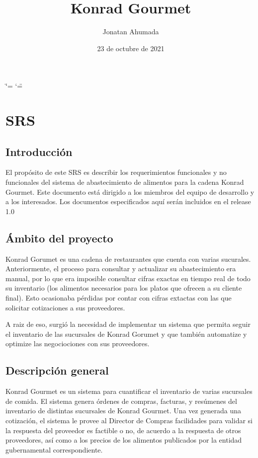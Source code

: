 \documentclass[letterpaper,10pt,spanish]{sphinxmanual}
\title{Konrad Gourmet}
\date{23 de octubre de 2021}
\author{Jonatan Ahumada}
\begin{document}
\ifdefined\shorthandoff
  \ifnum\catcode`\=\string=\active\shorthandoff{=}\fi
  \ifnum\catcode`\"=\active{}\fi
\fi

\pagestyle{empty}
\sphinxmaketitle
\pagestyle{plain}
\sphinxtableofcontents
\pagestyle{normal}
\label{\detokenize{index::doc}}



\chapter{SRS}
\label{\detokenize{SRS:srs}}\label{\detokenize{SRS::doc}}

\section{Introducción}
\label{\detokenize{SRS:introduccion}}
\sphinxAtStartPar
El propósito de este SRS es
describir los requerimientos
funcionales y no funcionales
del sistema de abastecimiento
de alimentos para la cadena
Konrad Gourmet. Este documento
está dirigido a los miembros
del equipo de desarrollo
y a los interesados. Los
documentos especificados
aquí serán incluidos en el release
1.0


\section{Ámbito del proyecto}
\label{\detokenize{SRS:ambito-del-proyecto}}
\sphinxAtStartPar
Konrad Gorumet es una cadena de
restaurantes que cuenta con varias sucurales.
Anteriormente, el proceso para consultar y
actualizar su abastecimiento era manual,
por lo que era imposible consultar
cifras exactas en tiempo real de todo
su inventario (los alimentos necesarios para
los platos que ofrecen a su cliente final). Esto ocasionaba pérdidas
por contar con cifras extactas con las
que solicitar cotizaciones a sus proveedores.

\sphinxAtStartPar
A raiz de eso, surgió la necesidad de implementar
un sistema que permita seguir el inventario
de las sucursales de Konrad Gorumet y que también automatize
y optimize las negociociones con sus proveedores.


\section{Descripción general}
\label{\detokenize{SRS:descripcion-general}}
\sphinxAtStartPar
Konrad Gourmet es un sistema para
cuantificar el inventario de
varias sucursales de comida.
El sistema genera órdenes de compras,
facturas, y resúmenes del inventario
de distintas sucursales de Konrad
Gourmet. Una vez generada una cotización,
el sistema le provee al Director de Compras
facilidades para validar si la respuesta del
proveedor es factible o no, de acuerdo
a la respuesta de otros proveedores, así
como a los precios de los alimentos
publicados por la entidad gubernamental
correspondiente.
\end{document}

